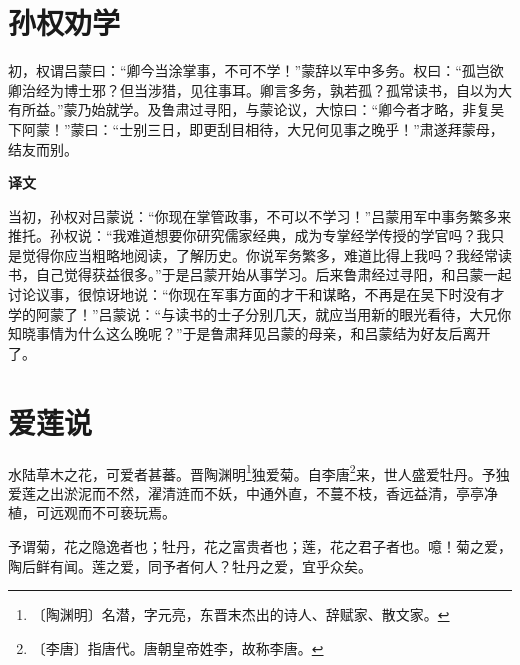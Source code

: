 \documentclass[12pt,UTF-8,openany,a4]{ctexbook}
\begin{document}
\chapter{孙权劝学}

\begin{large}
    
    初，权谓吕蒙曰：“卿今当涂掌事，不可不学！”蒙辞以军中多务。权曰：“孤岂欲卿治经为博士邪？但当涉猎，见往事耳。卿言多务，孰若孤？孤常读书，自以为大有所益。”蒙乃始就学。及鲁肃过寻阳，与蒙论议，大惊曰：“卿今者才略，非复吴下阿蒙！”蒙曰：“士别三日，即更刮目相待，大兄何见事之晚乎！”肃遂拜蒙母，结友而别。
\end{large}


\newpage

\begin{Large}
    \noindent\textbf{译文}
\end{Large}


\vspace{1em}

\begin{large}
    \yiwen 
    当初，孙权对吕蒙说：“你现在掌管政事，不可以不学习！”吕蒙用军中事务繁多来推托。孙权说：“我难道想要你研究儒家经典，成为专掌经学传授的学官吗？我只是觉得你应当粗略地阅读，了解历史。你说军务繁多，难道比得上我吗？我经常读书，自己觉得获益很多。”于是吕蒙开始从事学习。后来鲁肃经过寻阳，和吕蒙一起讨论议事，很惊讶地说：“你现在军事方面的才干和谋略，不再是在吴下时没有才学的阿蒙了！”吕蒙说：“与读书的士子分别几天，就应当用新的眼光看待，大兄你知晓事情为什么这么晚呢？”于是鲁肃拜见吕蒙的母亲，和吕蒙结为好友后离开了。
    
\end{large}



\chapter{爱莲说}

\begin{large}
    
    水陆草木之花，可爱者甚蕃。晋陶渊明\footnote{〔陶渊明〕\yiwen 名潜，字元亮，东晋末杰出的诗人、辞赋家、散文家。}独爱菊。自李唐\footnote{〔李唐〕\yiwen 指唐代。唐朝皇帝姓李，故称李唐。}来，世人盛爱牡丹。予独爱莲之出淤泥而不然，濯清涟而不妖，中通外直，不蔓不枝，香远益清，亭亭净植，可远观而不可亵玩焉。
    
    予谓菊，花之隐逸者也；牡丹，花之富贵者也；莲，花之君子者也。噫！菊之爱，陶后鲜有闻。莲之爱，同予者何人？牡丹之爱，宜乎众矣。
\end{large}
\end{document}
